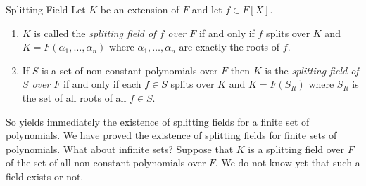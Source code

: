 \begin{Definition}{Splitting Field}{}
  Let $K$ be an extension of $F$ and let $f\in F[X]$. 
  \begin{enumerate}[label=(\roman*)]
    \item $K$ is called the \emph{splitting field of $f$ over $F$} if and only if $f$ splits over $K$ and $K=F(\alpha_1,\dots, \alpha_n)$ where $\alpha_1,\dots, \alpha_n$ are exactly the roots of $f$.
    \item If $S$ is a set of non-constant polynomials over $F$ then $K$ is the \emph{splitting field of $S$ over $F$} if and only if  each $f\in S$ splits over $K$ and $K=F(S_R)$ where $S_R$ is the set of all roots of all $f\in S$. 
  \end{enumerate}
\end{Definition}

So  yields immediately the existence of splitting fields for a finite set of polynomials.
We have proved the existence of splitting fields for finite sets of polynomials. 
What about infinite sets? 
Suppose that $K$ is a splitting field over $F$ of the set of all non-constant polynomials over $F$. We do not know yet that such a field exists or not.

